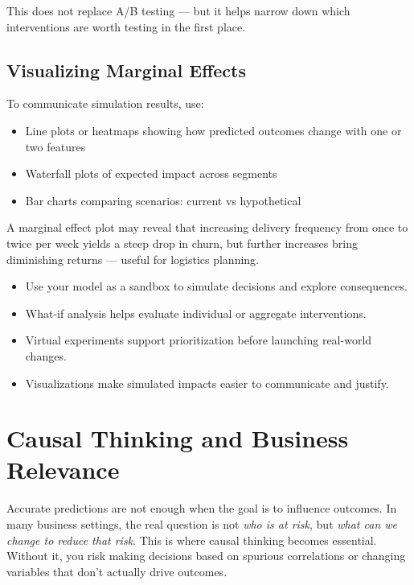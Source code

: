 \documentclass[12pt,openany, draft]{book}
\begin{document}
\begin{notebox}
This does not replace A/B testing — but it helps narrow down which interventions are worth testing in the first place.
\end{notebox}

\section{Visualizing Marginal Effects}

To communicate simulation results, use:
\begin{itemize}
  \item Line plots or heatmaps showing how predicted outcomes change with one or two features
  \item Waterfall plots of expected impact across segments
  \item Bar charts comparing scenarios: current vs hypothetical
\end{itemize}

\begin{examplebox}
A marginal effect plot may reveal that increasing delivery frequency from once to twice per week yields a steep drop in churn, but further increases bring diminishing returns — useful for logistics planning.
\end{examplebox}

\begin{summarybox}
\begin{itemize}
  \item Use your model as a sandbox to simulate decisions and explore consequences.
  \item What-if analysis helps evaluate individual or aggregate interventions.
  \item Virtual experiments support prioritization before launching real-world changes.
  \item Visualizations make simulated impacts easier to communicate and justify.
\end{itemize}
\end{summarybox}




\chapter{Causal Thinking and Business Relevance}

Accurate predictions are not enough when the goal is to influence outcomes. In many business settings, the real question is not \textit{who is at risk}, but \textit{what can we change to reduce that risk}. This is where causal thinking becomes essential. Without it, you risk making decisions based on spurious correlations or changing variables that don't actually drive outcomes.
\end{document}
